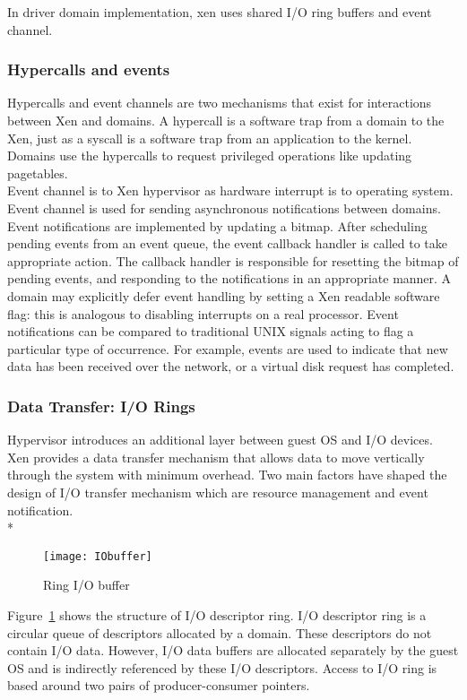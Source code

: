 In driver domain implementation, xen uses shared I/O ring buffers and event channel\cite{Barham:2003:XAV:1165389.945462, Nikolaev:2013:VOS:2517349.2522719, Ruslan}.

\subsubsection*{Hypercalls and events}

Hypercalls and event channels are two mechanisms that exist for interactions between Xen and domains. A hypercall is a software trap from a domain to the Xen, just as a syscall is a software trap from an application to the kernel\cite{hypercall}. Domains use the hypercalls to request privileged operations like updating pagetables. 
\\
Event channel is to Xen hypervisor as hardware interrupt is to operating system. Event channel is used for sending asynchronous notifications between domains. Event notifications are implemented by updating a bitmap. After scheduling pending events from an event queue, the event callback handler is called to take appropriate action. The callback handler is responsible for resetting the bitmap of pending events, and responding to the notifications in an appropriate manner. A domain may explicitly defer event handling by setting a Xen readable software flag: this is analogous to disabling interrupts on a real processor. Event notifications can be compared to traditional UNIX signals acting to flag a particular type of occurrence. For example, events are used to indicate that new data has been received over the network, or a virtual disk request has completed. 

\subsubsection*{Data Transfer: I/O Rings}
\label{subsec:io rings}
Hypervisor introduces an additional layer between guest OS and I/O devices. Xen provides a data transfer mechanism that allows data to move vertically through the system with minimum overhead. Two main factors have shaped the design of I/O transfer mechanism which are resource management and event notification. 
\\*
\begin{figure}[!ht]
\centering
\texttt{[image: IObuffer]}
\caption{Ring I/O buffer}
\label{fig:Ring buffer}
\end{figure}
Figure~\ref{fig:Ring buffer} shows the structure of I/O descriptor ring. I/O descriptor ring is a circular queue of descriptors allocated by a domain. These descriptors do not contain I/O data. However, I/O data buffers are allocated separately by the guest OS and is indirectly referenced by these I/O descriptors. Access to I/O ring is based around two pairs of producer-consumer pointers.

